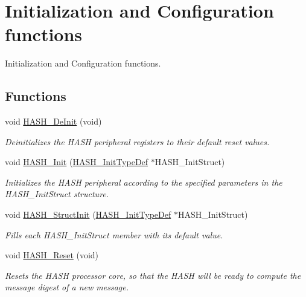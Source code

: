 \hypertarget{group___h_a_s_h___group1}{\section{Initialization and Configuration functions}
\label{group___h_a_s_h___group1}
}


Initialization and Configuration functions.  


\subsection*{Functions}
\begin{DoxyCompactItemize}
\item 
void \hyperlink{group___h_a_s_h___group1_ga88717fe3a4f557182841a958e1dcd9c7}{H\-A\-S\-H\-\_\-\-De\-Init} (void)
\begin{DoxyCompactList}\small\item\em Deinitializes the H\-A\-S\-H peripheral registers to their default reset values. \end{DoxyCompactList}\item 
void \hyperlink{group___h_a_s_h___group1_ga4a7d33f0954ac0463a6cda81121635cf}{H\-A\-S\-H\-\_\-\-Init} (\hyperlink{struct_h_a_s_h___init_type_def}{H\-A\-S\-H\-\_\-\-Init\-Type\-Def} $\ast$H\-A\-S\-H\-\_\-\-Init\-Struct)
\begin{DoxyCompactList}\small\item\em Initializes the H\-A\-S\-H peripheral according to the specified parameters in the H\-A\-S\-H\-\_\-\-Init\-Struct structure. \end{DoxyCompactList}\item 
void \hyperlink{group___h_a_s_h___group1_ga9cfaaa73eafec40a06154f58d48adeb5}{H\-A\-S\-H\-\_\-\-Struct\-Init} (\hyperlink{struct_h_a_s_h___init_type_def}{H\-A\-S\-H\-\_\-\-Init\-Type\-Def} $\ast$H\-A\-S\-H\-\_\-\-Init\-Struct)
\begin{DoxyCompactList}\small\item\em Fills each H\-A\-S\-H\-\_\-\-Init\-Struct member with its default value. \end{DoxyCompactList}\item 
void \hyperlink{group___h_a_s_h___group1_ga11745813cf85a08b2058aac3bd026e4d}{H\-A\-S\-H\-\_\-\-Reset} (void)
\begin{DoxyCompactList}\small\item\em Resets the H\-A\-S\-H processor core, so that the H\-A\-S\-H will be ready to compute the message digest of a new message. \end{DoxyCompactList}\end{DoxyCompactItemize}


